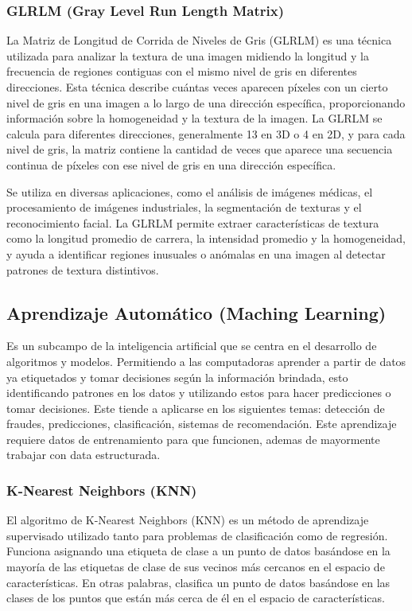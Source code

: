 \subsubsection{GLRLM (Gray Level Run Length Matrix)}
La Matriz de Longitud de Corrida de Niveles de Gris (GLRLM) es una técnica utilizada para analizar la textura de una imagen midiendo la longitud y la frecuencia de regiones contiguas con el mismo nivel de gris en diferentes direcciones. Esta técnica describe cuántas veces aparecen píxeles con un cierto nivel de gris en una imagen a lo largo de una dirección específica, proporcionando información sobre la homogeneidad y la textura de la imagen. La GLRLM se calcula para diferentes direcciones, generalmente 13 en 3D o 4 en 2D, y para cada nivel de gris, la matriz contiene la cantidad de veces que aparece una secuencia continua de píxeles con ese nivel de gris en una dirección específica.

Se utiliza en diversas aplicaciones, como el análisis de imágenes médicas, el procesamiento de imágenes industriales, la segmentación de texturas y el reconocimiento facial. La GLRLM permite extraer características de textura como la longitud promedio de carrera, la intensidad promedio y la homogeneidad, y ayuda a identificar regiones inusuales o anómalas en una imagen al detectar patrones de textura distintivos.


\subsection{Aprendizaje Automático  (Maching Learning)}
Es un subcampo de la inteligencia artificial que se centra en el desarrollo de algoritmos y modelos. Permitiendo a las computadoras aprender a partir de datos ya etiquetados y tomar decisiones según la información brindada, esto identificando patrones en los datos y utilizando estos para hacer predicciones o tomar decisiones.
Este tiende a aplicarse en los siguientes temas: detección de fraudes, predicciones, clasificación, sistemas de recomendación.
Este aprendizaje requiere datos de entrenamiento para que funcionen, ademas de mayormente trabajar con data estructurada.

\subsubsection{K-Nearest Neighbors (KNN)}
El algoritmo de K-Nearest Neighbors (KNN) es un método de aprendizaje supervisado utilizado tanto para problemas de clasificación como de regresión. Funciona asignando una etiqueta de clase a un punto de datos basándose en la mayoría de las etiquetas de clase de sus vecinos más cercanos en el espacio de características. En otras palabras, clasifica un punto de datos basándose en las clases de los puntos que están más cerca de él en el espacio de características.

